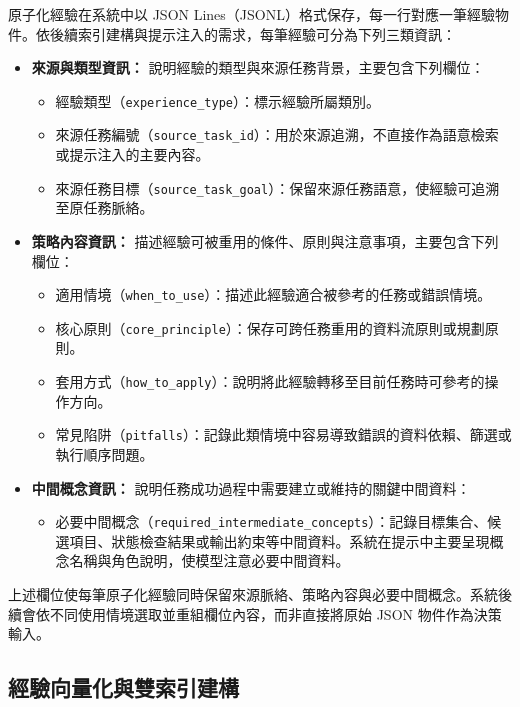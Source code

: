 \begin{ZhChapter}
原子化經驗在系統中以 JSON Lines（JSONL）格式保存，每一行對應一筆經驗物件。依後續索引建構與提示注入的需求，每筆經驗可分為下列三類資訊：

\begin{itemize}
    \item \textbf{來源與類型資訊：}
    說明經驗的類型與來源任務背景，主要包含下列欄位：
    \begin{itemize}
        \item 經驗類型（\texttt{experience\_type}）：標示經驗所屬類別。
        \item 來源任務編號（\texttt{source\_task\_id}）：用於來源追溯，不直接作為語意檢索或提示注入的主要內容。
        \item 來源任務目標（\texttt{source\_task\_goal}）：保留來源任務語意，使經驗可追溯至原任務脈絡。
    \end{itemize}

    \item \textbf{策略內容資訊：}
    描述經驗可被重用的條件、原則與注意事項，主要包含下列欄位：
    \begin{itemize}
        \item 適用情境（\texttt{when\_to\_use}）：描述此經驗適合被參考的任務或錯誤情境。
        \item 核心原則（\texttt{core\_principle}）：保存可跨任務重用的資料流原則或規劃原則。
        \item 套用方式（\texttt{how\_to\_apply}）：說明將此經驗轉移至目前任務時可參考的操作方向。
        \item 常見陷阱（\texttt{pitfalls}）：記錄此類情境中容易導致錯誤的資料依賴、篩選或執行順序問題。
    \end{itemize}

    \item \textbf{中間概念資訊：}
    說明任務成功過程中需要建立或維持的關鍵中間資料：
    \begin{itemize}
        \item 必要中間概念（\texttt{required\_intermediate\_concepts}）：記錄目標集合、候選項目、狀態檢查結果或輸出約束等中間資料。系統在提示中主要呈現概念名稱與角色說明，使模型注意必要中間資料。
    \end{itemize}
\end{itemize}

上述欄位使每筆原子化經驗同時保留來源脈絡、策略內容與必要中間概念。系統後續會依不同使用情境選取並重組欄位內容，而非直接將原始 JSON 物件作為決策輸入。

\subsection{經驗向量化與雙索引建構}


\end{ZhChapter}
